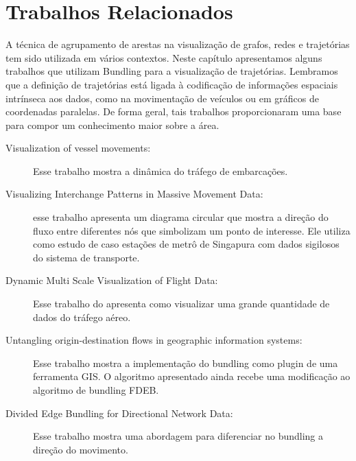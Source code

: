 \chapter{Trabalhos Relacionados}
\label{cap:trabalhos-relacionados}

  A técnica de agrupamento de arestas na visualização de grafos, redes e trajetórias
tem sido utilizada em vários contextos. Neste capítulo apresentamos alguns trabalhos
que utilizam Bundling para a visualização de trajetórias. Lembramos que a definição
de trajetórias está ligada à codificação de informações espaciais intrínseca aos
dados, como na movimentação de veículos ou em gráficos de coordenadas paralelas.
De forma geral, tais trabalhos proporcionaram uma base para compor um conhecimento maior
sobre a área.

\begin{description}

  \item[Visualization of vessel movements:]
  Esse trabalho mostra a dinâmica do tráfego de embarcações. \citep{Willems2009}

  \item[Visualizing Interchange Patterns in Massive Movement Data:] esse
trabalho apresenta um diagrama circular que mostra a direção do fluxo entre
diferentes nós que simbolizam um ponto de interesse. Ele utiliza como estudo de
caso estações de metrô de Singapura com dados sigilosos do sistema de
transporte. \citep{Zeng2013} 

\item[Dynamic Multi Scale Visualization of Flight Data:]
 Esse trabalho do apresenta como visualizar uma grande quantidade
de dados do tráfego aéreo. \citep{Klein2014}

\item[Untangling origin-destination flows in geographic information systems:]
 Esse trabalho mostra a implementação do bundling como plugin de uma ferramenta GIS.
O algoritmo apresentado ainda recebe uma modificação ao algoritmo de bundling FDEB. \citep{Anita2017}

\item[Divided Edge Bundling for Directional Network Data:]
  Esse trabalho mostra uma abordagem para diferenciar no bundling a direção do movimento.
\citep{Selassie2011}
\end{description}

